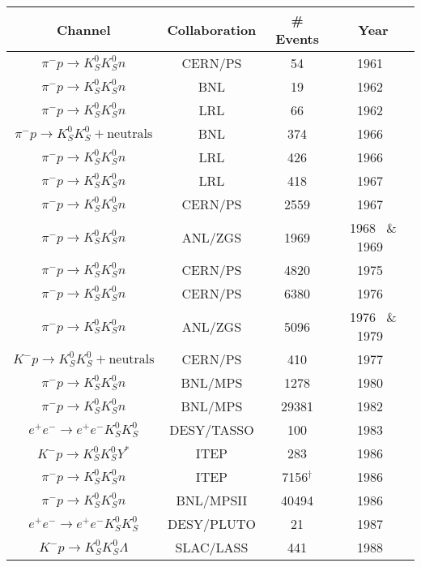 \begin{table}
  \begin{center}
    \begin{tabular}{cccc}\toprule
      Channel & Collaboration & \# Events & Year\\\midrule
      $\pi^- p \to K_S^0 K_S^0 n$ & CERN/PS & 54 & 1961~\cite{DiCorato1961}\\
      $\pi^- p \to K_S^0 K_S^0 n$ & BNL & 19 & 1962~\cite{Erwin1962}\\
    $\pi^- p \to K_S^0 K_S^0 n$ & LRL & 66 & 1962~\cite{Alexander1962}\\
    $\pi^- p \to K_S^0 K_S^0 + \text{neutrals}$ & BNL & 374 & 1966~\cite{Crennell1966}\\
  $\pi^- p \to K_S^0 K_S^0 n$ & LRL & 426 & 1966~\cite{Hess1966}\\
  $\pi^- p \to K_S^0 K_S^0 n$ & LRL & 418 & 1967~\cite{Dahl1967}\\
  $\pi^- p \to K_S^0 K_S^0 n$ & CERN/PS & 2559 & 1967~\cite{Beusch1967}\\
  $\pi^- p \to K_S^0 K_S^0 n$ & ANL/ZGS & 1969 & 1968~\cite{Hoang1968} \& 1969~\cite{Hoang1969}\\
$\pi^- p \to K_S^0 K_S^0 n$ & CERN/PS & 4820 & 1975~\cite{Beusch1975}\\
$\pi^- p \to K_S^0 K_S^0 n$ & CERN/PS & 6380 & 1976~\cite{Wetzel1976}\\
$\pi^- p \to K_S^0 K_S^0 n$ & ANL/ZGS & 5096 & 1976~\cite{Cason1976} \& 1979~\cite{Polychronakos1979}\\
$K^- p \to K_S^0 K_S^0 + \text{neutrals}$ & CERN/PS & 410 & 1977~\cite{Barreiro1977}\\
$\pi^- p \to K_S^0 K_S^0 n$ & BNL/MPS & 1278 & 1980~\cite{Gottesman1980}\\
$\pi^- p \to K_S^0 K_S^0 n$ & BNL/MPS & 29381 & 1982~\cite{Etkin1982}\\
$e^+e^- \to e^+e^- K_S^0 K_S^0$ & DESY/TASSO & 100 & 1983~\cite{Althoff1983}\\
$K^-p \to K_S^0K_S^0 Y^*$ & ITEP & 283 & 1986~\cite{Bolonkin1986}\\
$\pi^-p \to K_S^0K_S^0 n$ & ITEP & 7156${}^{\dagger}$ & 1986~\cite{Baloshin1986}\\
    $\pi^- p \to K_S^0 K_S^0 n$ & BNL/MPSII & 40494 & 1986~\cite{Longacre1986}\\
  $e^+e^- \to e^+e^- K_S^0 K_S^0$ & DESY/PLUTO & 21 & 1987~\cite{Berger1988}\\
$K^- p \to K_S^0 K_S^0 \Lambda$ & SLAC/LASS & 441 & 1988~\cite{Aston1988}\\

\end{tabular}
\end{center}
\end{table}
